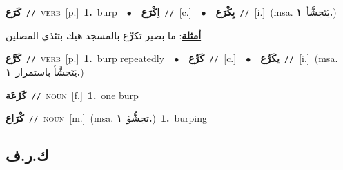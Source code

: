 \documentclass[10pt,a4paper,twoside]{article} %
\begin{document}
\begin{multicols}{2}
{\setlength\topsep{0pt}\textbf{\foreignlanguage{arabic}{كَرَع}}\ {\color{gray}\texttt{//}\color{black}}\ \textsc{verb}\ [p.]\ \textbf{1.}~burp\ \ $\bullet$\ \ \setlength\topsep{0pt}\textbf{\foreignlanguage{arabic}{اِكْرَع}}\ {\color{gray}\texttt{//}\color{black}}\ [c.]\ \ $\bullet$\ \ \setlength\topsep{0pt}\textbf{\foreignlanguage{arabic}{يِكْرَع}}\ {\color{gray}\texttt{//}\color{black}}\ [i.]\ \color{gray}(msa. \foreignlanguage{arabic}{يَتَجشَّأ}~\foreignlanguage{arabic}{\textbf{١.}})\color{black}\  \begin{flushright}\color{gray}\foreignlanguage{arabic}{\textbf{\underline{\foreignlanguage{arabic}{أمثلة}}}: ما بصير تكرِّع بالمسجد هيك بتئذي المصلين}\end{flushright}\color{black}} \vspace{2mm}

{\setlength\topsep{0pt}\textbf{\foreignlanguage{arabic}{كَرَّع}}\ {\color{gray}\texttt{//}\color{black}}\ \textsc{verb}\ [p.]\ \textbf{1.}~burp repeatedly\ \ $\bullet$\ \ \setlength\topsep{0pt}\textbf{\foreignlanguage{arabic}{كَرِّع}}\ {\color{gray}\texttt{//}\color{black}}\ [c.]\ \ $\bullet$\ \ \setlength\topsep{0pt}\textbf{\foreignlanguage{arabic}{يكَرِّع}}\ {\color{gray}\texttt{//}\color{black}}\ [i.]\ \color{gray}(msa. \foreignlanguage{arabic}{يَتَجشَّأ باستمرار}~\foreignlanguage{arabic}{\textbf{١.}})\color{black}\ } \vspace{2mm}

{\setlength\topsep{0pt}\textbf{\foreignlanguage{arabic}{كَرْعَة}}\ {\color{gray}\texttt{//}\color{black}}\ \textsc{noun}\ [f.]\ \textbf{1.}~one burp\ } \vspace{2mm}

{\setlength\topsep{0pt}\textbf{\foreignlanguage{arabic}{كْرَاع}}\ {\color{gray}\texttt{//}\color{black}}\ \textsc{noun}\ [m.]\ \color{gray}(msa. \foreignlanguage{arabic}{تجشُّؤ}~\foreignlanguage{arabic}{\textbf{١.}})\color{black}\ \textbf{1.}~burping\ } \vspace{2mm}

\vspace{-3mm}
\subsection*{\color{blue}\foreignlanguage{arabic}{ك.ر.ف}\color{blue}{}} 


\end{multicols}
\end{document}

